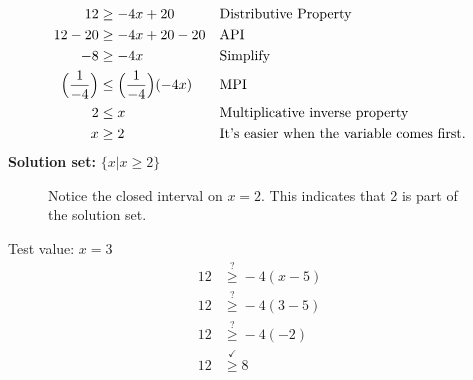 \begin{example}[I.]
\begin{enumerate}[1.]
\Solution
\begin{align*}
12 &\ge -4x+20 && \text{Distributive Property}\\
12-20 & \ge -4x+20-20 && \text{API}\\
-8 & \ge -4x && \text{Simplify}\\
\Bigl(\frac{1}{-4}\Bigr) &\le \Bigl(\frac{1}{-4}\Bigr)(-4x) && \text{MPI}\\
2 &\le x && \text{Multiplicative inverse property}\\
x &\ge 2 && \text{It's easier when the variable comes first.}
\end{align*}
\textbf{Solution set:} $\{x\vert x\ge 2\}$
\begin{figure}[!h]
\centering
\caption{Notice the closed interval on $x=2$. This indicates that 2 is part of the solution set.}
\label{chap6fig:3}
\end{figure}

\CHECK{} Test value: $x=3$
\begin{align*}
12&\overset{?}{\ge}-4(x-5)\\
12&\overset{?}{\ge}-4(3-5)\\
12&\overset{?}{\ge}-4(-2)\\
12&\overset{\checkmark}{\ge}8
\end{align*}
	\end{enumerate}
\end{example}
